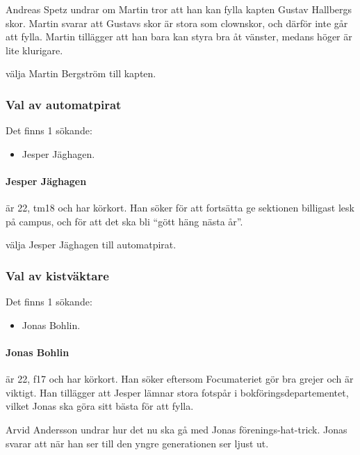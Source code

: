 \documentclass[hidelinks]{sektionsmote}
\begin{document}
Andreas Spetz undrar om Martin tror att han kan fylla kapten Gustav Hallbergs skor.
Martin svarar att Gustavs skor är stora som clownskor, och därför inte går att fylla.
Martin tillägger att han bara kan styra bra åt vänster, medans höger är lite klurigare.

\begin{beslut}
  \item välja Martin Bergström till kapten.
\end{beslut}

\subsubsection{Val av automatpirat}
Det finns 1 sökande:
\begin{itemize}
    \item Jesper Jäghagen.
\end{itemize}

\paragraph{Jesper Jäghagen} är 22, tm18 och har körkort.
Han söker för att fortsätta ge sektionen billigast lesk på campus, och för att det ska bli \enquote{gött häng nästa år}.

\begin{beslut}
  \item välja Jesper Jäghagen till automatpirat.
\end{beslut}

\subsubsection{Val av kistväktare}
Det finns 1 sökande:
\begin{itemize}
    \item Jonas Bohlin.
\end{itemize}

\paragraph{Jonas Bohlin} är 22, f17 och har körkort.
Han söker eftersom Focumateriet gör bra grejer och är viktigt.
Han tillägger att Jesper lämnar stora fotspår i bokföringsdepartementet, vilket Jonas ska göra sitt bästa för att fylla.

Arvid Andersson undrar hur det nu ska gå med Jonas förenings-hat-trick.
Jonas svarar att när han ser till den yngre generationen ser ljust ut.
\end{document}
